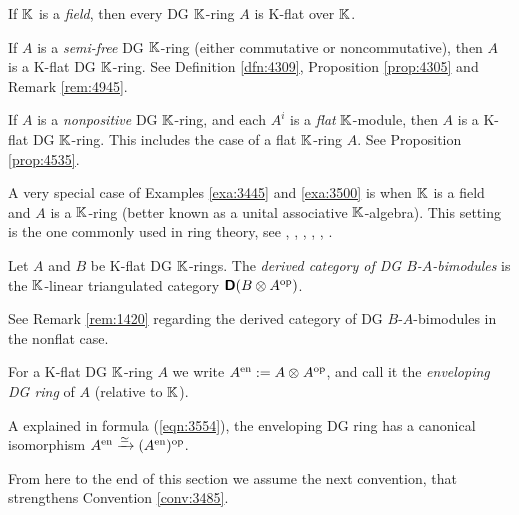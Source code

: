 \begin{exa} \label{exa:3445}
If $\mathbb{K}$ is a {\em field}, then every DG  $\mathbb{K}$-ring $A$ is K-flat over 
$\mathbb{K}$.
\end{exa}

\begin{exa} \label{exa:3501}
If $A$ is a {\em semi-free} DG $\mathbb{K}$-ring (either commutative or 
noncommutative), then $A$ is a K-flat DG $\mathbb{K}$-ring. 
See Definition \ref{dfn:4309}, Proposition \ref{prop:4305} and Remark 
\ref{rem:4945}. 
\end{exa}

\begin{exa} \label{exa:3500}
If $A$ is a {\em nonpositive} DG $\mathbb{K}$-ring, and each 
$A^i$ is a {\em flat} $\mathbb{K}$-module, then $A$ is a K-flat DG $\mathbb{K}$-ring.
This includes the case of a flat $\mathbb{K}$-ring $A$. 
See Proposition \ref{prop:4535}. 
\end{exa}

\begin{exa} \label{exa:3525}
A very special case of Examples \ref{exa:3445} and \ref{exa:3500} is when 
$\mathbb{K}$ is a field and $A$ is a $\mathbb{K}$-ring (better known as a unital 
associative $\mathbb{K}$-algebra). 
This setting is the one commonly used in ring theory, see 
\cite{ATV}, \cite{ArZh}, \cite{Ye1}, \cite{VdB}, \cite{StaVdB}, \cite{YeZh1}. 
\end{exa}

\begin{dfn} \label{dfn:3595}
Let $A$ and $B$ be K-flat DG $\mathbb{K}$-rings. The 
{\em derived category of DG $B$-$A$-bimodules} 
is the $\mathbb{K}$-linear triangulated category 
$\boldsymbol{\mathsf{D}}(B \otimes A^{\mathrm{op}})$. 
\end{dfn}

See Remark \ref{rem:1420} regarding the derived category of DG 
$B$-$A$-bimodules in the nonflat case.

\begin{dfn} \label{dfn:3450}
For a K-flat DG $\mathbb{K}$-ring $A$ we write 
$A^{\mathrm{en}} := A \otimes_{} A^{\mathrm{op}}$, 
and call it the {\em enveloping DG ring} 
of $A$ (relative to $\mathbb{K}$).
\end{dfn}

A explained in formula (\ref{eqn:3554}), the enveloping DG ring has a canonical 
isomorphism 
$A^{\mathrm{en}} \xrightarrow{\simeq} (A^{\mathrm{en}})^{\mathrm{op}}$.

From here to the end of this section we assume the next convention, that 
strengthens Convention \ref{conv:3485}.  

